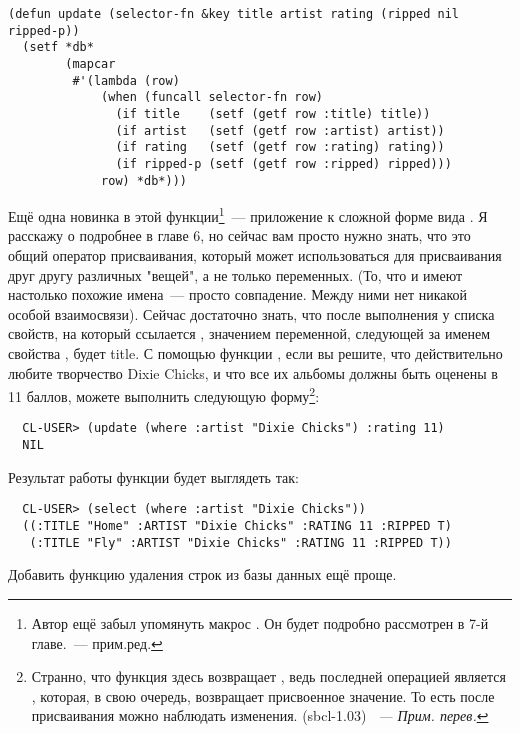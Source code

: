 \begin{lstlisting}
(defun update (selector-fn &key title artist rating (ripped nil ripped-p))
  (setf *db*
        (mapcar
         #'(lambda (row)
             (when (funcall selector-fn row)
               (if title    (setf (getf row :title) title))
               (if artist   (setf (getf row :artist) artist))
               (if rating   (setf (getf row :rating) rating))
               (if ripped-p (setf (getf row :ripped) ripped)))
             row) *db*)))
\end{lstlisting}

Ещё одна новинка в этой функции\footnote{Автор ещё забыл упомянуть макрос . Он
  будет подробно рассмотрен в 7-й главе.~--- прим.ред.}~--- приложение  к
сложной форме вида . Я расскажу о  подробнее в главе 6,
но сейчас вам просто нужно знать, что это общий оператор присваивания, который может
использоваться для присваивания друг другу различных "вещей", а не только переменных. (То,
что  и  имеют настолько похожие имена~--- просто совпадение. Между
ними нет никакой особой взаимосвязи). Сейчас достаточно знать, что после выполнения
 у списка свойств, на который ссылается ,
значением переменной, следующей за именем свойства , будет title. С помощью
функции , если вы решите, что действительно любите творчество Dixie Chicks, и
что все их альбомы должны быть оценены в 11 баллов, можете выполнить следующую
форму\footnote{Странно, что функция  здесь возвращает , ведь последней
  операцией является , которая, в свою очередь, возвращает
  присвоенное значение. То есть после присваивания можно наблюдать изменения. (sbcl-1.03)
  \textit{~--- Прим. перев.}}:

\begin{verbatim}
  CL-USER> (update (where :artist "Dixie Chicks") :rating 11)
  NIL
\end{verbatim}

Результат работы функции будет выглядеть так:

\begin{verbatim}
  CL-USER> (select (where :artist "Dixie Chicks"))
  ((:TITLE "Home" :ARTIST "Dixie Chicks" :RATING 11 :RIPPED T)
   (:TITLE "Fly" :ARTIST "Dixie Chicks" :RATING 11 :RIPPED T))
\end{verbatim}

Добавить функцию удаления строк из базы данных ещё проще.

